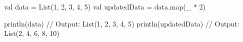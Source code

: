 val data = List(1, 2, 3, 4, 5)
val updatedData = data.map(_ * 2)

println(data)       // Output: List(1, 2, 3, 4, 5)
println(updatedData) // Output: List(2, 4, 6, 8, 10)